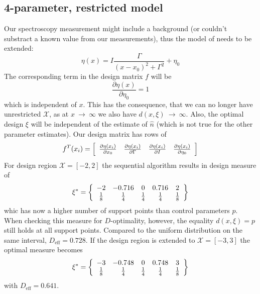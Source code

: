 \documentclass[12pt]{iopart}
\begin{document}
\subsection{4-parameter, restricted model}

Our spectroscopy measurement might include a background (or couldn't substract a known value from our measurements), thus the model of  needs to be extended:
\begin{equation}
\eta(x) = I \frac{\Gamma}{(x - x_0)^2 + \Gamma^2} + \eta_0
\label{eq:lorentz4}
\end{equation}
The corresponding term in the design matrix $f$ will be
\begin{equation}
\frac{\partial \eta(x)}{\partial \eta_0} = 1
\end{equation}
which is independent of $x$. This has the consequence, that we can no longer have unrestricted $\mathcal{X}$, as at $x~\rightarrow~\infty$ we also have $d(x,\xi)~\rightarrow~\infty$. Also, the optimal design $\xi$ will be independent of the estimate of $\hat n$ (which is not true for the other parameter estimates). Our design matrix has rows of
\begin{equation}
 f^T(x_i) = \left[
  \begin{array}{l l l l}
   \frac{\partial \eta(x_i)}{\partial x_0} & \frac{\partial \eta(x_i)}{\partial \Gamma} & \frac{\partial \eta(x_i)}{\partial I} & \frac{\partial \eta(x_i)}{\partial \eta_0}
  \end{array} \right ]
\end{equation}
For design region $\mathcal{X} = [-2, 2]$ the sequential algorithm results in design measure of
\begin{equation}
\xi^* = \left\{
  \begin{array}{c c c c c}
    -2 & -0.716 & 0 & 0.716 & 2\\
    \frac{1}{8} & \frac{1}{4} & \frac{1}{4} & \frac{1}{4} & \frac{1}{8}\\
  \end{array} \right \}
\end{equation}
whic has now a higher number of support points than control parameters $p$. When checking this measure for $D$-optimality, however, the equality $d(x, \xi) = p$ still holds at all support points. Compared to the uniform distribution on the same interval, $D_\mathrm{eff} = 0.728$. If the design region is extended to $\mathcal{X} = [-3, 3]$ the optimal measure becomes
\begin{equation}
\xi^* = \left\{
  \begin{array}{c c c c c}
    -3 & -0.748 & 0 & 0.748 & 3\\
    \frac{1}{8} & \frac{1}{4} & \frac{1}{4} & \frac{1}{4} & \frac{1}{8}\\
  \end{array} \right \}
\end{equation}
with $D_\mathrm{eff} = 0.641$.
\end{document}
